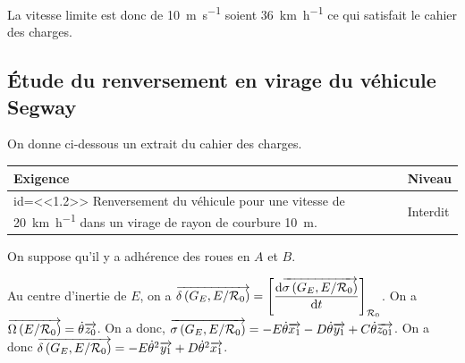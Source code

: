 \documentclass[10pt,fleqn]{article} %
\newif\ifnormal
\newif\iftdifficile
\begin{document}
\begin{multicols}{2}
\ifnormal
\subparagraph{}\textit{Faire les applications numériques nécessaires et vérifier la conformité au cahier des charges.}
\else
\fi
\ifprof
\begin{corrige}
La vitesse limite est donc de \SI{10}{m.s^{-1}} soient \SI{36}{km.h^{-1}} ce qui satisfait le cahier des charges. 
\end{corrige}
\else
\fi

\iftdifficile
\subparagraph{}\textit{Exprimer la vitesse limite pour laquelle il n'y a pas de dérapage. Vérifier alors que l'exigence 1.1 est vérifiée.}

\else
\fi


\subsection*{Étude du renversement en virage du véhicule Segway}
\ifprof
\else
On donne ci-dessous un extrait du cahier des charges.


\begin{center}
\begin{tabular}{|p{.7\linewidth}|p{.2\linewidth}|}
\hline 
Exigence & Niveau \\
\hline
id=<<1.2>> Renversement du véhicule pour une vitesse de \SI{20}{km.h^{-1}} dans un virage de rayon de courbure \SI{10}{m}.
& Interdit \\
\hline
\end{tabular}
\end{center}

\begin{hypo}
On suppose qu’il y a adhérence des roues en $A$ et $B$.
\end{hypo}
\fi

\ifnormal
\subparagraph{}\textit{Calculer le torseur dynamique du système matériel $E$ en $G_E$ dans son mouvement par rapport au référentiel $\rep{0}=\repere{O}{x_0}{y_0}{z_0}$ . Exprimer ses composantes dans la base $\mathcal{B}_1=\base{x_1}{y_1}{z_1}$ .}
\else
\fi
\ifprof
\begin{corrige}
Au centre d'inertie de $E$, on a $\overrightarrow{\delta \left( {G_E}, {E} /{\mathcal{R}_{0}}\right)}=\left[\dfrac{\text{d} \overrightarrow{\sigma \left( {G_E}, {E} /{\mathcal{R}_{0}}\right)}}{\text{d} t}\right]_{\mathcal{R}_{0}}$. On a $\overrightarrow{\Omega\left( {E}/{\mathcal{R}_{0}}\right)}=\dot{\theta}\overrightarrow{z_0}$. On a donc, $ \overrightarrow{\sigma \left( {G_E}, {E} /{\mathcal{R}_{0}}\right)}=-E\dot{\theta}\overrightarrow{x_1}-D\dot{\theta}\overrightarrow{y_1}+C\dot{\theta}\overrightarrow{z_{01}}$.
On a donc $\overrightarrow{\delta \left( {G_E}, {E} /{\mathcal{R}_{0}}\right)}=-E\dot{\theta}^2\overrightarrow{y_1}+D\dot{\theta}^2\overrightarrow{x_1}$.


\end{corrige}
\end{multicols}
\end{document}
